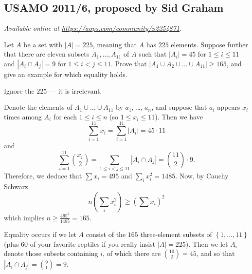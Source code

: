 \documentclass[11pt]{scrartcl}
\begin{document}
\subsection{USAMO 2011/6, proposed by Sid Graham}
\textsl{Available online at \url{https://aops.com/community/p2254871}.}
\begin{mdframed}[style=mdpurplebox,frametitle={Problem statement}]
Let $A$ be a set with $|A|=225$, meaning that $A$ has $225$ elements.
Suppose further that there are eleven subsets $A_1, \dots, A_{11}$ of $A$
such that $|A_i|=45$ for $1\leq i\leq11$ and $|A_i\cap A_j|=9$
for $1\leq i<j\leq11$.
Prove that $|A_1\cup A_2\cup\dots\cup A_{11}|\geq 165$,
and give an example for which equality holds.
\end{mdframed}
Ignore the $225$ --- it is irrelevant.

Denote the elements of $A_1 \cup \dots \cup A_{11}$
by $a_1$, \dots, $a_n$,
and suppose that $a_i$ appears $x_i$ times among $A_i$
for each $1 \le i \le n$ (so $1 \le x_i \le 11$).
Then we have
\[ \sum_{i=1}^{11} x_i = \sum_{i=1}^{11} |A_i| = 45 \cdot 11 \]
and
\[ \sum_{i=1}^{11} \binom{x_i}{2} = \sum_{1 \le i < j \le 11}
  \left\lvert A_i \cap A_j \right\rvert
  = \binom{11}{2} \cdot 9. \]
Therefore, we deduce that
$\sum x_i = 495$ and $\sum_i x_i^2 = 1485$.
Now, by Cauchy Schwarz
\[ n \left( \sum_i x_i^2 \right) \ge \left( \sum x_i \right)^2 \]
which implies $n \ge \frac{495^2}{1485} = 165$.

Equality occurs if we let $A$ consist of the $165$
three-element subsets of $\left\{ 1, \dots, 11 \right\}$
(plus $60$ of your favorite reptiles
if you really insist $|A|=225$).
Then we let $A_i$ denote those subsets containing $i$,
of which there are $\binom{10}{2} = 45$,
and so that $|A_i \cap A_j| = \binom 91 = 9$.
\pagebreak
\end{document}
